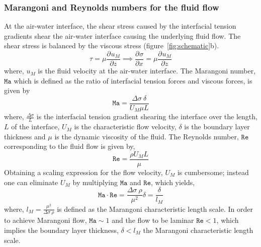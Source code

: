 \documentclass[journal=langd5, manuscript=article, layout=twocolumn]{achemso}
\newcommand{\pdc}[3][]{\frac{\partial^{#1} #2}{\partial #3^{#1}}} %
\begin{document}
\subsubsection{Marangoni and Reynolds numbers for the fluid flow}
At the air-water interface, the shear stress caused by the interfacial tension gradients shear the air-water interface causing the underlying fluid flow. The shear stress is balanced by the viscous stress (figure~\ref{fig:schematic}b).
\begin{equation*}
\tau = \mu \pdc{u_{M}}{z} 
\implies \pdc{\sigma}{x} = \mu \pdc{u_{M}}{z}
\end{equation*} 
where, $u_{M}$ is the fluid velocity at the air-water interface. The Marangoni number, $\mathtt{Ma}$ which is defined as the ratio of interfacial tension forces and viscous forces, is given by
\begin{equation}\label{eq:numberMa}
\mathtt{Ma} = \frac{\Delta\sigma\ \delta}{U_{M} \mu L}
\end{equation}
where, $\frac{\Delta\sigma}{L}$ is the interfacial tension gradient shearing the interface over the length, $L$ of the interface, $U_{M}$ is the characteristic flow velocity, $\delta$ is the boundary layer thickness and $\mu$ is the dynamic viscosity of the fluid. The Reynolds number, $\mathtt{Re}$ corresponding to the fluid flow is given by,
\begin{equation}\label{eq:numberRe}
\mathtt{Re} = \frac{\rho U_{M} L}{\mu}
\end{equation}
Obtaining a scaling expression for the flow velocity, $U_{M}$ is cumbersome; instead one can eliminate $U_{M}$ by multiplying $\mathtt{Ma}$ and $\mathtt{Re}$, which yields,
\begin{equation}
\mathtt{Ma} \cdot \mathtt{Re} = \frac{\Delta\sigma\ \rho}{\mu^{2}} \delta = \frac{\delta}{l_{M}}
\end{equation}
where, $l_{M} = \frac{\mu^{2}}{\Delta\sigma\ \rho}$ is defined as the Marangoni characteristic length scale. In order to achieve Marangoni flow, $\mathtt{Ma} \sim 1$ and the flow to be laminar $\mathtt{Re} < 1$, which implies the boundary layer thickness, $\delta < l_{M}$ the Marangoni characteristic length scale. 
\end{document}
